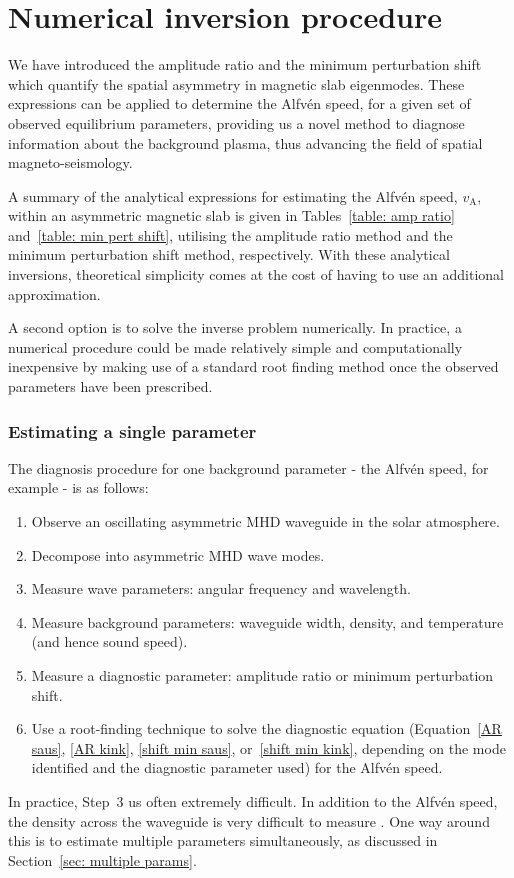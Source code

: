 \section{Numerical inversion procedure}
\label{sec: numerical inversion}

We have introduced the amplitude ratio and the minimum perturbation shift which quantify the spatial asymmetry in magnetic slab eigenmodes. These expressions can be applied to determine the Alfv\'{e}n speed, for a given set of observed equilibrium parameters, providing us a novel method to diagnose information about the background plasma, thus advancing the field of spatial magneto-seismology.

A summary of the analytical expressions for estimating the Alfv\'{e}n speed, $v_\textrm{A}$, within an asymmetric magnetic slab is given in Tables~\ref{table: amp ratio} and~\ref{table: min pert shift}, utilising the amplitude ratio method and the minimum perturbation shift method, respectively. With these analytical inversions, theoretical simplicity comes at the cost of having to use an additional approximation.

A second option is to solve the inverse problem numerically. In practice, a numerical procedure could be made relatively simple and computationally inexpensive by making use of a standard root finding method once the observed parameters have been prescribed.


\subsubsection{Estimating a single parameter} \label{sec: single param}

The diagnosis procedure for one background parameter - the Alfv\'{e}n speed, for example - is as follows:
\begin{enumerate}
	\item Observe an oscillating asymmetric MHD waveguide in the solar atmosphere.
	\item Decompose into asymmetric MHD wave modes.
	\item Measure wave parameters: angular frequency and wavelength.
	\item Measure background parameters: waveguide width, density, and temperature (and hence sound speed).
	\item Measure a diagnostic parameter: amplitude ratio or minimum perturbation shift.
	\item Use a root-finding technique to solve the diagnostic equation (Equation~\eqref{AR saus}, \eqref{AR kink}, \eqref{shift min saus}, or~\eqref{shift min kink}, depending on the mode identified and the diagnostic parameter used) for the Alfv\'{e}n speed.
\end{enumerate}
In practice, Step~3 us often extremely difficult. In addition to the Alfv\'{e}n speed, the density across the waveguide is very difficult to measure \citep{war_etal09}. One way around this is to estimate multiple parameters simultaneously, as discussed in Section~\ref{sec: multiple params}.


